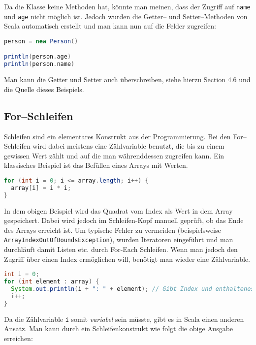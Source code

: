Da die Klasse keine Methoden hat, könnte man meinen, dass der Zugriff auf \texttt{name} und \texttt{age} nicht möglich ist. Jedoch wurden die Getter-- und Setter--Methoden von Scala automatisch erstellt und man kann nun auf die Felder zugreifen:

\begin{lstlisting}[language=Scala]
person = new Person()

println(person.age)
println(person.name)
\end{lstlisting}

Man kann die Getter und Setter auch überschreiben, siehe hierzu \cite{ScalaCookbook} Section 4.6 und die Quelle dieses Beispiels.

\subsection{For--Schleifen}\label{sec:for-loops}

Schleifen sind ein elementares Konstrukt aus der Programmierung. Bei den For--Schleifen wird dabei meistens eine Zählvariable benutzt, die bis zu einem gewissen Wert zählt und auf die man währenddessen zugreifen kann. Ein klassisches Beispiel ist das Befüllen eines Arrays mit Werten.

\begin{lstlisting}[language=Java,caption=Typische For--Schleife aus der Java Programmierung]
for (int i = 0; i <= array.length; i++) {
  array[i] = i * i;
}
\end{lstlisting}

In dem obigen Beispiel wird das Quadrat vom Index als Wert in dem Array gespeichert. Dabei wird jedoch im Schleifen-Kopf manuell geprüft, ob das Ende des Arrays erreicht ist. Um typische Fehler zu vermeiden (beispielsweise \texttt{ArrayIndexOutOfBoundsException}), wurden Iteratoren eingeführt und man durchläuft damit Listen etc. durch For-Each Schleifen. Wenn man jedoch den Zugriff über einen Index ermöglichen will, benötigt man wieder eine Zählvariable.

\begin{lstlisting}[language=Java]
int i = 0;
for (int element : array) {
  System.out.println(i + ": " + element); // Gibt Index und enthaltenes Element aus
  i++;
}
\end{lstlisting}

Da die Zählvariable \texttt{i} somit \textit{variabel} sein müsste, gibt es in Scala einen anderen Ansatz. Man kann durch ein Schleifenkonstrukt wie folgt die obige Ausgabe erreichen:

